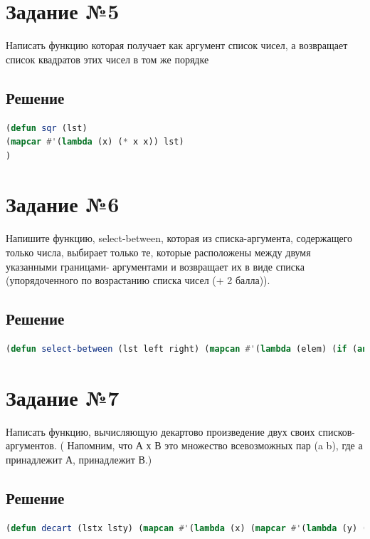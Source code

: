 \documentclass[12pt]{report}
\begin{document}
\section*{Задание №5}
Написать функцию которая получает как аргумент список чисел, а возвращает список
квадратов этих чисел в том же порядке

\subsection*{Решение}
\begin{lstlisting}[label=5,caption=Решение задания №5, language=lisp]
(defun sqr (lst)
(mapcar #'(lambda (x) (* x x)) lst)
)
\end{lstlisting}

\section*{Задание №6}
Напишите функцию, select-between, которая из списка-аргумента, содержащего только
числа, выбирает только те, которые расположены между двумя указанными границами-
аргументами и возвращает их в виде списка (упорядоченного по возрастанию списка чисел
(+ 2 балла)).
\subsection*{Решение}
\begin{lstlisting}[label=5,caption=Решение задания №5, language=lisp]
(defun select-between (lst left right) (mapcan #'(lambda (elem) (if (and (< elem right) (> elem left)) (list elem) nil)) lst))

\end{lstlisting}


\section*{Задание №7}
Написать функцию, вычисляющую декартово произведение двух своих списков-
аргументов. ( Напомним, что А х В это множество всевозможных пар (a b), где а
принадлежит А, принадлежит В.)
\subsection*{Решение}
\begin{lstlisting}[label=5,caption=Решение задания №5, language=lisp]
(defun decart (lstx lsty) (mapcan #'(lambda (x) (mapcar #'(lambda (y) (list x y)) lsty)) lstx))

\end{lstlisting}
\end{document}
